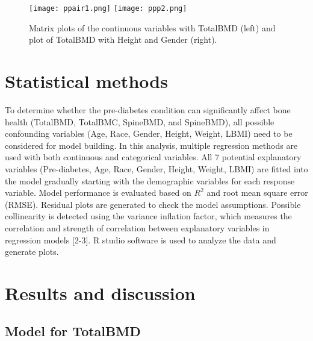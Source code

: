 \documentclass[11pt]{article}
\begin{document}
\begin{figure}[!htbp]
\texttt{[image: ppair1.png]}
\texttt{[image: ppp2.png]}
\caption{Matrix plots of the continuous variables with TotalBMD (left) and plot of TotalBMD with Height and Gender (right).}
\label{fig:method}
\end{figure}            

\section{Statistical methods}
To determine whether the pre-diabetes condition can significantly affect bone health (TotalBMD, TotalBMC, SpineBMD, and SpineBMD), all possible confounding variables (Age, Race, Gender, Height, Weight, LBMI) need to be considered for model building. In this analysis, multiple regression methods are used with both continuous and categorical variables. All 7 potential explanatory variables (Pre-diabetes, Age, Race, Gender, Height, Weight, LBMI) are fitted into the model gradually starting with the demographic variables for each response variable. Model performance is evaluated based on $R^2$ and root mean square error (RMSE). Residual plots are generated to check the model assumptions. Possible collinearity is detected using the variance inflation factor, which measures the correlation and strength of correlation between explanatory variables in regression models [2-3]. R studio software is used to analyze the data and generate plots. 

\section{Results and discussion}
\subsection{Model for TotalBMD}
\end{document}
